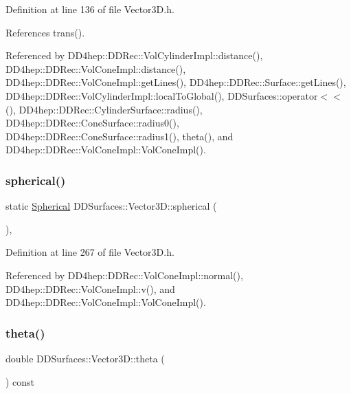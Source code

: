 Definition at line 136 of file Vector3\+D.\+h.



References trans().



Referenced by D\+D4hep\+::\+D\+D\+Rec\+::\+Vol\+Cylinder\+Impl\+::distance(), D\+D4hep\+::\+D\+D\+Rec\+::\+Vol\+Cone\+Impl\+::distance(), D\+D4hep\+::\+D\+D\+Rec\+::\+Vol\+Cone\+Impl\+::get\+Lines(), D\+D4hep\+::\+D\+D\+Rec\+::\+Surface\+::get\+Lines(), D\+D4hep\+::\+D\+D\+Rec\+::\+Vol\+Cylinder\+Impl\+::local\+To\+Global(), D\+D\+Surfaces\+::operator$<$$<$(), D\+D4hep\+::\+D\+D\+Rec\+::\+Cylinder\+Surface\+::radius(), D\+D4hep\+::\+D\+D\+Rec\+::\+Cone\+Surface\+::radius0(), D\+D4hep\+::\+D\+D\+Rec\+::\+Cone\+Surface\+::radius1(), theta(), and D\+D4hep\+::\+D\+D\+Rec\+::\+Vol\+Cone\+Impl\+::\+Vol\+Cone\+Impl().

\hypertarget{class_d_d_surfaces_1_1_vector3_d_a2c73305f5aef051f55f33b721a68b660}{}\label{class_d_d_surfaces_1_1_vector3_d_a2c73305f5aef051f55f33b721a68b660} 
\subsubsection{\texorpdfstring{spherical()}{spherical()}}
{\footnotesize\ttfamily static \hyperlink{struct_d_d_surfaces_1_1_vector3_d_1_1_spherical}{Spherical} D\+D\+Surfaces\+::\+Vector3\+D\+::spherical (\begin{DoxyParamCaption}{ }\end{DoxyParamCaption})\hspace{0.3cm}{\ttfamily [inline]}, {\ttfamily [static]}}



Definition at line 267 of file Vector3\+D.\+h.



Referenced by D\+D4hep\+::\+D\+D\+Rec\+::\+Vol\+Cone\+Impl\+::normal(), D\+D4hep\+::\+D\+D\+Rec\+::\+Vol\+Cone\+Impl\+::v(), and D\+D4hep\+::\+D\+D\+Rec\+::\+Vol\+Cone\+Impl\+::\+Vol\+Cone\+Impl().

\hypertarget{class_d_d_surfaces_1_1_vector3_d_ae775f1d9753bde89f04ec1326f62cbab}{}\label{class_d_d_surfaces_1_1_vector3_d_ae775f1d9753bde89f04ec1326f62cbab} 
\subsubsection{\texorpdfstring{theta()}{theta()}}
{\footnotesize\ttfamily double D\+D\+Surfaces\+::\+Vector3\+D\+::theta (\begin{DoxyParamCaption}{ }\end{DoxyParamCaption}) const\hspace{0.3cm}{\ttfamily [inline]}}

